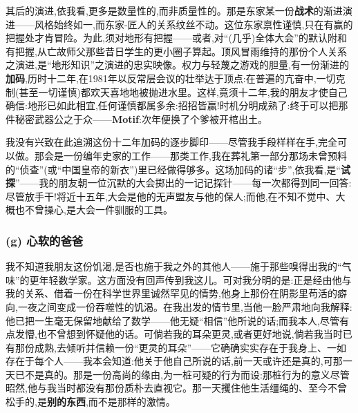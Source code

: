 \dmark{}其后的演进,依我看,更多是数量性的,而非质量性的。那是东家某一份\textbf{战术}的渐进演进——风格始终如一,而东家-匠人的关系纹丝不动。这位东家禀性谨慎,只在有赢的把握处才肯冒险。为此,须对地形有把握——或者,对“(几乎)全体大会”的默认附和有把握,从亡故师父那些昔日学生的更小圈子算起。顶风冒雨维持的那份个人关系之演进,是“地形知识”之演进的忠实映像。权力与轻蔑之游戏的胆量,有一份渐进的\textbf{加码},历时十二年,在1981年以反常层会议的壮举达于顶点:在普遍的亢奋中,一切克制(甚至一切谨慎)都欢天喜地地被抛进水里。这样,竟须十二年,我的朋友才使自己确信:地形已如此相宜,任何谨慎都属多余:招招皆赢!时机分明成熟了:终于可以把那件秘密武器公之于众——\textbf{Motif}:次年便换了个爹被开棺出土。

我没有兴致在此追溯这份十二年加码的逐步脚印——尽管我手段样样在手,完全可以做。那会是一份编年史家的工作——那类工作,我在葬礼第一部分那场未曾预料的“侦查”(或“中国皇帝的新衣”)里已经做得够多。这场加码的诸“步”,依我看,是“\textbf{试探}”——我的朋友朝一位沉默的大会掷出的一记记探针——每一次都得到同一回答:尽管放手干!将近十五年,大会是他的无声盟友与他的保人;而他,在不知不觉中、大概也不曾操心,是大会一件驯服的工具。

\subsubsection*{(g) 心软的爸爸}
\label{ch18:local:h60}

\label{ch18:local:n55}

\dmark{}我不知道我朋友这份饥渴,是否也施于我之外的其他人——施于那些嗅得出我的“气味”的更年轻数学家。这方面没有回声传到我这儿。可对我分明的是:正是经由他与我的关系、借着一份在科学世界里诚然罕见的情势,他身上那份在阴影里苟活的癖向,一夜之间变成一份吞噬性的饥渴。在我出发的情节里,当他一脸严肃地向我解释:他已把一生毫无保留地献给了数学——他无疑“相信”他所说的话;而我本人,尽管有点发懵,也不曾想到怀疑他的话。可倘若我的耳朵更灵,或者更好地说,倘若我当时已有那份成熟,去倾听并信赖一份“更灵的耳朵”——它确确实实存在于我身上、一如存在于每个人——我本会知道:他关于他自己所说的话,前一天或许还是真的,可那一天已不是真的。那是一份高尚的缘由,为一桩可疑的行为而设:那桩行为的意义尽管昭然,他与我当时都没有那份质朴去直视它。那一天攫住他生活缰绳的、至今不曾松手的,是\textbf{别的东西},而不是那样的激情。

